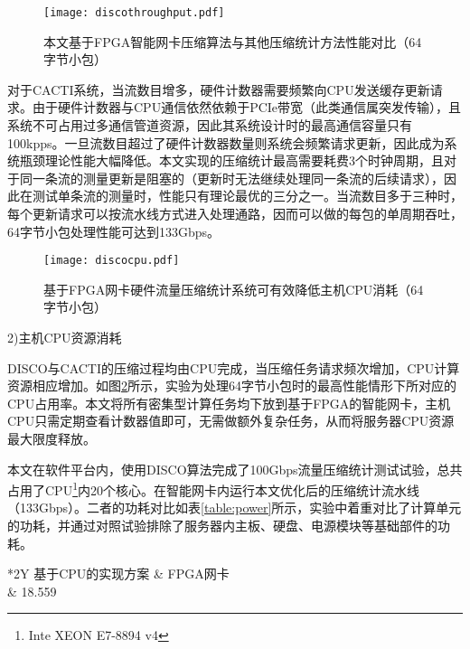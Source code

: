 \begin{figure}[!ht]
	\centering 
	\vspace{-1.5mm} 
	\texttt{[image: discothroughput.pdf]}
	\caption{本文基于FPGA智能网卡压缩算法与其他压缩统计方法性能对比（64字节小包）} \label{fig:discothroughput}
\end{figure}

对于CACTI系统，当流数目增多，硬件计数器需要频繁向CPU发送缓存更新请求。由于硬件计数器与CPU通信依然依赖于PCIe带宽（此类通信属突发传输），且系统不可占用过多通信管道资源，因此其系统设计时的最高通信容量只有100kpps。一旦流数目超过了硬件计数器数量则系统会频繁请求更新，因此成为系统瓶颈理论性能大幅降低。本文实现的压缩统计最高需要耗费3个时钟周期，且对于同一条流的测量更新是阻塞的（更新时无法继续处理同一条流的后续请求），因此在测试单条流的测量时，性能只有理论最优的三分之一。当流数目多于三种时，每个更新请求可以按流水线方式进入处理通路，因而可以做的每包的单周期吞吐，64字节小包处理性能可达到133Gbps。


\begin{figure}[!ht]
	\centering 
	\vspace{-1.5mm} 
	\texttt{[image: discocpu.pdf]}
	\caption{基于FPGA网卡硬件流量压缩统计系统可有效降低主机CPU消耗（64字节小包）} \label{fig:discocpu}
\end{figure}


2)主机CPU资源消耗

DISCO与CACTI的压缩过程均由CPU完成，当压缩任务请求频次增加，CPU计算资源相应增加。如图\ref{fig:discocpu}所示，实验为处理64字节小包时的最高性能情形下所对应的CPU占用率。本文将所有密集型计算任务均下放到基于FPGA的智能网卡，主机CPU只需定期查看计数器值即可，无需做额外复杂任务，从而将服务器CPU资源最大限度释放。

本文在软件平台内，使用DISCO算法完成了100Gbps流量压缩统计测试试验，总共占用了CPU\footnote{Inte XEON E7-8894 v4}内20个核心。在智能网卡内运行本文优化后的压缩统计流水线（133Gbps）。二者的功耗对比如表\ref{table:power}所示，实验中着重对比了计算单元的功耗，并通过对照试验排除了服务器内主板、硬盘、电源模块等基础部件的功耗。

\begin{table}[!ht]
	\renewcommand{\arraystretch}{1.2}
	\centering\wuhao
	\caption{不同平台下压缩统计功能功耗对比（单位：瓦特）} \label{table:power} \vspace{4mm}
	\begin{tabularx}{\textwidth}{*{2}Y}
		\toprule[1.5pt]
		基于CPU的实现方案 & FPGA网卡 \\
		 & 18.559\\
		\bottomrule[1.5pt]
	\end{tabularx}
\end{table}

